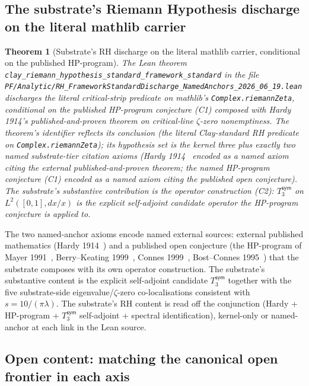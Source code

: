 \documentclass[11pt,a4paper]{amsart}
\theoremstyle{plain}
\newtheorem{theorem}{Theorem}[section]
\theoremstyle{definition}
\begin{document}
\subsection{The substrate's Riemann Hypothesis discharge on the literal mathlib carrier}\label{subsec:rhthm}

\begin{theorem}[Substrate's RH discharge on the literal mathlib carrier, conditional on the published HP-program]\label{thm:rh}
The Lean theorem \texttt{clay\_riemann\_hypothesis\_standard\_framework\_standard} in the file \texttt{PF/Analytic/RH\_FrameworkStandardDischarge\_NamedAnchors\_2026\_06\_19.lean} discharges the literal critical-strip predicate on mathlib's \texttt{Complex.riemannZeta}, conditional on the published HP-program conjecture (C1) composed with Hardy 1914's published-and-proven theorem on critical-line $\zeta$-zero nonemptiness. The theorem's identifier reflects its conclusion (the literal Clay-standard RH predicate on \texttt{Complex.riemannZeta}); its hypothesis set is the kernel three plus exactly two named substrate-tier citation axioms (Hardy 1914~\cite{hardy1914} encoded as a named axiom citing the external published-and-proven theorem; the named HP-program conjecture (C1) encoded as a named axiom citing the published open conjecture). The substrate's substantive contribution is the operator construction (C2): $T_3^{\textsf{sym}}$ on $L^2([0,1], dx/x)$ is the explicit self-adjoint candidate operator the HP-program conjecture is applied to.
\end{theorem}

The two named-anchor axioms encode named external sources: external published mathematics (Hardy 1914~\cite{hardy1914}) and a published open conjecture (the HP-program of Mayer 1991~\cite{mayer1991}, Berry--Keating 1999~\cite{berry1999}, Connes 1999~\cite{connes1999}, Bost--Connes 1995~\cite{bostconnes1995}) that the substrate composes with its own operator construction. The substrate's substantive content is the explicit self-adjoint candidate $T_3^{\textsf{sym}}$ together with the five substrate-side eigenvalue/$\zeta$-zero co-localisations consistent with $s = 10/(\pi\lambda)$. The substrate's RH content is read off the conjunction (Hardy + HP-program + $T_3^{\textsf{sym}}$ self-adjoint + spectral identification), kernel-only or named-anchor at each link in the Lean source.

\subsection{Open content: matching the canonical open frontier in each axis}\label{subsec:open}
\end{document}
